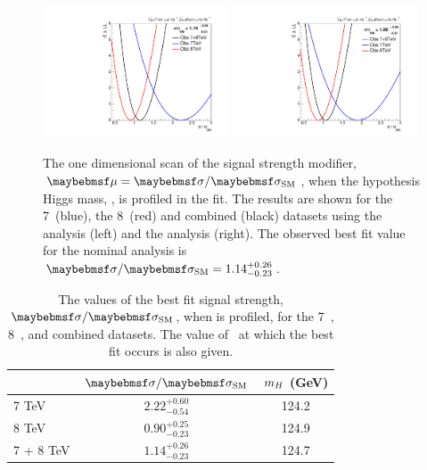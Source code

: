\begin{figure}
  \includegraphics[width=0.49\textwidth]{results/plots/mva_mu_scan.pdf}
  \includegraphics[width=0.49\textwidth]{results/plots/sideband_mu_scan.pdf}
  \caption[The 1D \NLL scan of the signal strength modifier $\mu$]{The one dimensional \NLL scan of the signal strength modifier, $\mu=\musm$, when the hypothesis Higgs mass, \mH, is profiled in the fit. The results are shown for the 7~\TeV (blue), the 8~\TeV (red) and combined (black) datasets using the \MFM analysis (left) and the \SMVA analysis (right). The observed best fit value for the nominal \MFM analysis is $\musm=1.14^{+0.26}_{-0.23}$.}
  \label{fig:res_muscan}
\end{figure}

\begin{table}
    \caption[The values of the best fit signal strength, $\musm$, when \mH is profiled, for the 7~TeV, 8~TeV and combined datasets]{\label{tab:res_mu} The values of the best fit signal
      strength, $\musm$, when \mH is profiled, for the 7~\TeV, 8~\TeV, and combined datasets. 
      The value of \mH\ at which the best fit occurs is also given.
      }
  \begin{center}
    \begin{tabular}{l c c}
      & $\musm$  & $m_{H}$ (GeV)       \\  
      \hline
      \hline
      7 TeV  & $2.22^{+0.60}_{-0.54}$ & 124.2  \\ 
      8 TeV  & $0.90^{+0.25}_{-0.23}$ & 124.9  \\ \hline
      7 + 8 TeV & $1.14^{+0.26}_{-0.23}$ & 124.7  \\ 
    \end{tabular}
    \end{center}
\end{table}

